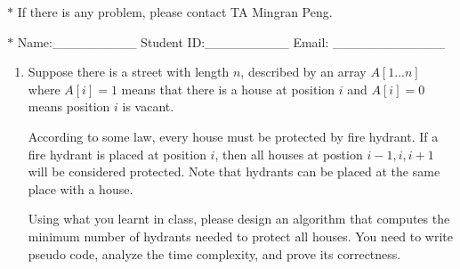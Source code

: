\documentclass[12pt,a4paper]{article}
\theoremstyle{definition}
\begin{document}
\noindent

\noindent{}


\begin{center}
\footnotesize{\color{red}$*$ If there is any problem, please contact TA Mingran Peng.}\par
\footnotesize{\color{blue}$*$ Name:\_\_\_\_\_\_\_\_\_  \quad Student ID:\_\_\_\_\_\_\_\_\_ \quad Email: \_\_\_\_\_\_\_\_\_\_\_\_}
\end{center}
\begin{enumerate}
    \item
    Suppose there is a street with length $n$, described by an array $A[1...n]$ where $A[i]=1$ means that there is a house at position $i$ and $A[i]=0$ means position $i$ is vacant.\par
	According to some law, every house must be protected by fire hydrant. If a fire hydrant is placed at position $i$, then all houses at postion $i-1,i,i+1$ will be considered protected. Note that hydrants can be placed at the same place with a house.\par
	Using what you learnt in class, please design an algorithm that computes the minimum number of hydrants needed to protect all houses. You need to write pseudo code, analyze the time complexity,  and prove its correctness.\par


\end{enumerate}
\end{document}
